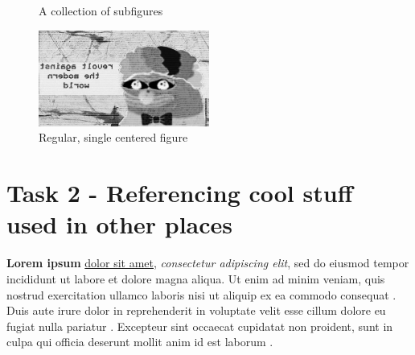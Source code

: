 \documentclass[journal,onecolumn]{IEEEtran}
\begin{document}
\begin{figure}[h]
    \centering
    \caption{A collection of subfigures}
\end{figure}

\begin{figure}[h]
	\centering
  	\includegraphics[width=0.5\textwidth]{img/img4.png}
  	\caption{Regular, single centered figure}	
  	\label{fig:img1}
\end{figure}

\section{Task 2 - Referencing cool stuff used in other places}
\textbf{Lorem ipsum} \underline{dolor sit amet}, \textit{consectetur adipiscing elit}, sed do eiusmod tempor incididunt ut labore et dolore magna aliqua. Ut enim ad minim veniam, quis nostrud exercitation ullamco laboris nisi ut aliquip ex ea commodo consequat \cite{kanto:kanto}. Duis aute irure dolor in reprehenderit in voluptate velit esse cillum dolore eu fugiat nulla pariatur \cite{monge:monge}. Excepteur sint occaecat cupidatat non proident, sunt in culpa qui officia deserunt mollit anim id est laborum \cite{web:web}.
\\
\end{document}
